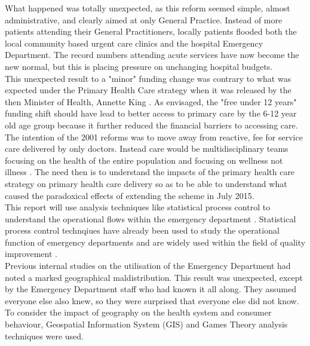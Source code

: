 \documentclass[11pt,a4paper]{article}
\begin{document}
What happened was totally unexpected, as this reform seemed simple, almost administrative, and clearly aimed at only General Practice. Instead of more patients  attending their General Practitioners, locally patients flooded both the local community based urgent care clinics and the hospital Emergency Department. The record numbers attending acute services have now become the new normal, but this is placing pressure on unchanging hospital budgets. \\

This unexpected result to a "minor" funding change was contrary to what was expected under the Primary Health Care strategy when it was released by the then Minister of Health, Annette King \citep{king2001primary}. As envisaged, the "free under 12 years" funding shift should have lead to better access to primary care by the 6-12 year old age group because it further reduced the financial barriers to accessing care. The intention of the 2001 reforms was to move away from reactive, fee for service care delivered by only doctors. Instead care would be multidisciplinary teams focusing on the health of the entire population and focusing on wellness not illness \citep{king2001primary}.  The need then is to understand the impacts of the primary health care strategy on primary health care delivery so as to be able to understand what caused the paradoxical effects of extending the scheme in July 2015.\\

This report will use analysis techniques like statistical process control to understand the operational flows within the emergency department \citep{rosemann2015six, cheng2015run, epprecht2015statistical}. Statistical process control technqiues have already been used to study the operational function of emergency departments \citep{pimentel2015statistical} and are widely used within the field of quality improvement \citep{provost2011health}.\\

Previous internal studies on the utilisation of the Emergency Department had noted a marked geographical maldistribution. This result was unexpected, except by the Emergency Department staff who had known it all along. They assumed everyone else also knew, so they were surprised that everyone else did not know. To consider the impact of geography on the health system and consumer behaviour, Geospatial Information System (GIS) and Games Theory analysis techniques were used.\\
\end{document}
